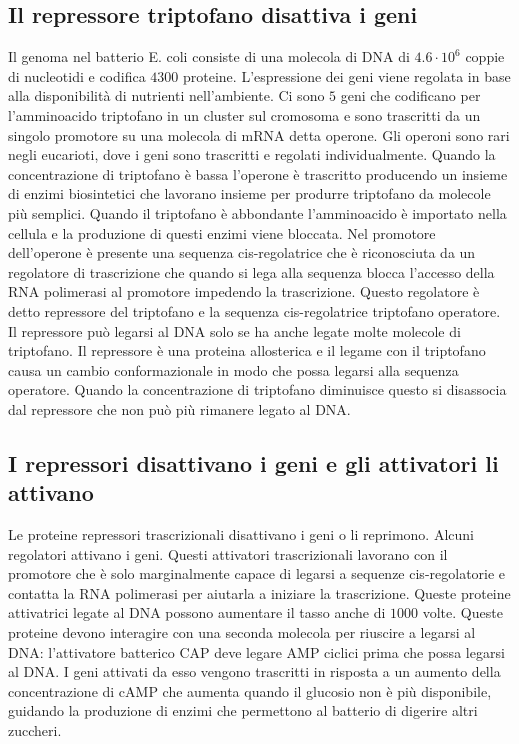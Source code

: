 \subsection{Il repressore triptofano disattiva i geni}
Il genoma nel batterio E. coli consiste di una molecola di DNA di $4.6\cdot 10^6$ coppie di nucleotidi e codifica $4300$ proteine. L'espressione dei geni viene regolata in base alla
disponibilit\`a di nutrienti nell'ambiente. Ci sono $5$ geni che codificano per l'amminoacido triptofano in un cluster sul cromosoma e sono trascritti da un singolo promotore su una 
molecola di mRNA detta operone. Gli operoni sono rari negli eucarioti, dove i geni sono trascritti e regolati individualmente. Quando la concentrazione di triptofano \`e bassa l'operone
\`e trascritto producendo un insieme di enzimi biosintetici che lavorano insieme per produrre triptofano da molecole pi\`u semplici. Quando il triptofano \`e abbondante l'amminoacido \`e
importato nella cellula e la produzione di questi enzimi viene bloccata. Nel promotore dell'operone \`e presente una sequenza cis-regolatrice che \`e riconosciuta da un regolatore 
di trascrizione che quando si lega alla sequenza blocca l'accesso della RNA polimerasi al promotore impedendo la trascrizione. Questo regolatore \`e detto repressore del triptofano
e la sequenza cis-regolatrice triptofano operatore. Il repressore pu\`o legarsi al DNA solo se ha anche legate molte molecole di triptofano. Il repressore \`e una proteina allosterica e 
il legame con il triptofano causa un cambio conformazionale in modo che possa legarsi alla sequenza operatore. Quando la concentrazione di triptofano diminuisce questo si disassocia dal
repressore che non pu\`o pi\`u rimanere legato al DNA.
\subsection{I repressori disattivano i geni e gli attivatori li attivano}
Le proteine repressori trascrizionali disattivano i geni o li reprimono. Alcuni regolatori attivano i geni. Questi attivatori trascrizionali lavorano con il promotore che \`e solo 
marginalmente capace di legarsi a sequenze cis-regolatorie e contatta la RNA polimerasi per aiutarla a iniziare la trascrizione. Queste proteine attivatrici legate al DNA possono 
aumentare il tasso anche di $1000$ volte. Queste proteine devono interagire con una seconda molecola per riuscire a legarsi al DNA: l'attivatore batterico CAP deve legare AMP ciclici 
prima che possa legarsi al DNA. I geni attivati da esso vengono trascritti in risposta a un aumento della concentrazione di cAMP che aumenta quando il glucosio non \`e pi\`u disponibile,
guidando la produzione di enzimi che permettono al batterio di digerire altri zuccheri. 
